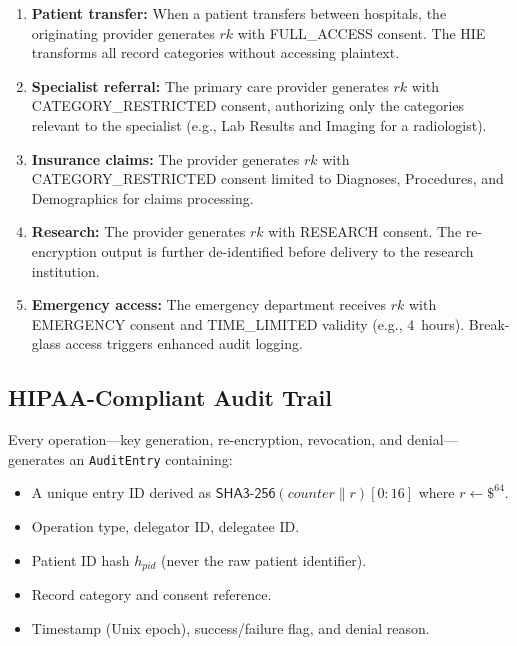 \documentclass[conference,10pt]{IEEEtran}
\newcommand{\shaiii}{\textsf{SHA3-256}}
\begin{document}
\begin{enumerate}[leftmargin=*]
    \item \textbf{Patient transfer:} When a patient transfers between hospitals, the originating provider generates $\mathit{rk}$ with FULL\_ACCESS consent. The HIE transforms all record categories without accessing plaintext.

    \item \textbf{Specialist referral:} The primary care provider generates $\mathit{rk}$ with CATEGORY\_RESTRICTED consent, authorizing only the categories relevant to the specialist (e.g., Lab Results and Imaging for a radiologist).

    \item \textbf{Insurance claims:} The provider generates $\mathit{rk}$ with CATEGORY\_RESTRICTED consent limited to Diagnoses, Procedures, and Demographics for claims processing.

    \item \textbf{Research:} The provider generates $\mathit{rk}$ with RESEARCH consent. The re-encryption output is further de-identified before delivery to the research institution.

    \item \textbf{Emergency access:} The emergency department receives $\mathit{rk}$ with EMERGENCY consent and TIME\_LIMITED validity (e.g., 4~hours). Break-glass access triggers enhanced audit logging.
\end{enumerate}

\subsection{HIPAA-Compliant Audit Trail}

Every operation---key generation, re-encryption, revocation, and denial---generates an \texttt{AuditEntry} containing:

\begin{itemize}[leftmargin=*]
    \item A unique entry ID derived as $\shaiii{}(\mathit{counter} \| r)[0{:}16]$ where $r \leftarrow \$^{64}$.
    \item Operation type, delegator ID, delegatee ID.
    \item Patient ID hash $h_{\mathit{pid}}$ (never the raw patient identifier).
    \item Record category and consent reference.
    \item Timestamp (Unix epoch), success/failure flag, and denial reason.
\end{itemize}
\end{document}
